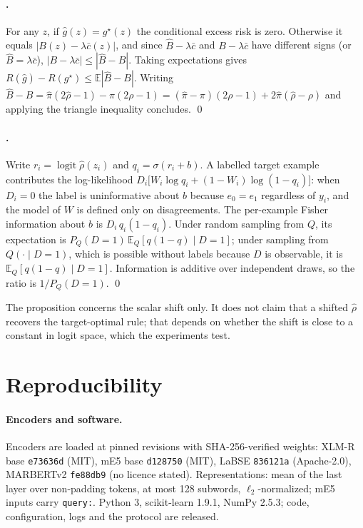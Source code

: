 \paragraph{.}
For any $z$, if $\hat g(z)=g^\star(z)$ the conditional excess risk is zero. Otherwise it equals $|B(z)-\lambda\bar c(z)|$, and since $\hat B-\lambda\bar c$ and $B-\lambda\bar c$ have different signs (or $\hat B=\lambda\bar c$), $|B-\lambda\bar c|\le|\hat B-B|$. Taking expectations gives $R(\hat g)-R(g^\star)\le\mathbb E|\hat B-B|$. Writing $\hat B-B=\hat\pi(2\hat\rho-1)-\pi(2\rho-1)=(\hat\pi-\pi)(2\rho-1)+2\hat\pi(\hat\rho-\rho)$ and applying the triangle inequality concludes. \qed

\paragraph{.}
Write $r_i=\operatorname{logit}\hat\rho(z_i)$ and $q_i=\sigma(r_i+b)$. A labelled target example contributes the log-likelihood $D_i\big[W_i\log q_i+(1-W_i)\log(1-q_i)\big]$: when $D_i=0$ the label is uninformative about $b$ because $e_0=e_1$ regardless of $y_i$, and the model of $W$ is defined only on disagreements. The per-example Fisher information about $b$ is $D_i\,q_i(1-q_i)$. Under random sampling from $Q$, its expectation is $P_Q(D{=}1)\,\mathbb E_Q[q(1-q)\mid D{=}1]$; under sampling from $Q(\cdot\mid D{=}1)$, which is possible without labels because $D$ is observable, it is $\mathbb E_Q[q(1-q)\mid D{=}1]$. Information is additive over independent draws, so the ratio is $1/P_Q(D{=}1)$. \qed

The proposition concerns the scalar shift only. It does not claim that a shifted $\hat\rho$ recovers the target-optimal rule; that depends on whether the shift is close to a constant in logit space, which the experiments test.






\section{Reproducibility}
\label{app:repro}
\paragraph{Encoders and software.} Encoders are loaded at pinned revisions with SHA-256-verified weights: XLM-R base \texttt{e73636d} (MIT), mE5 base \texttt{d128750} (MIT), LaBSE \texttt{836121a} (Apache-2.0), MARBERTv2 \texttt{fe88db9} (no licence stated). Representations: mean of the last layer over non-padding tokens, at most 128 subwords, $\ell_2$-normalized; mE5 inputs carry \texttt{query:}. Python 3, scikit-learn 1.9.1, NumPy 2.5.3; code, configuration, logs and the protocol are released.

